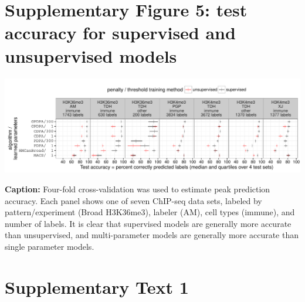 \documentclass{article}
\begin{document}
\section*{Supplementary Figure 5: test accuracy for supervised and unsupervised models}

\includegraphics[width=\textwidth]{figure-test-error-dots-parameters}

\textbf{Caption:}
Four-fold cross-validation was used to estimate peak prediction
accuracy. Each panel shows one of seven ChIP-seq data sets, labeled by
pattern/experiment (Broad H3K36me3), labeler (AM), cell types
(immune), and number of labels. It is clear that supervised models are
generally more accurate than unsupervised, and multi-parameter models
are generally more accurate than single parameter models.




\section{Supplementary Text 1}
\end{document}
